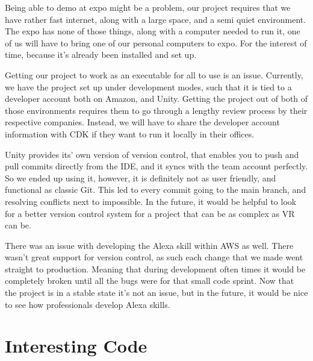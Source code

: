 \documentclass[onecolumn, draftclsnofoot,10pt, compsoc]{IEEEtran}
\begin{document}
Being able to demo at expo might be a problem, our project requires that we have rather fast internet, along with a large space, and a semi quiet environment. The expo has none of those things, along with a computer needed to run it, one of us will have to bring one of our personal computers to expo. For the interest of time, because it's already been installed and set up. \newline

Getting our project to work as an executable for all to use is an issue. Currently, we have the project set up under development modes, such that it is tied to a developer account both on Amazon, and Unity. Getting the project out of both of those environments requires them to go through a lengthy review process by their respective companies. Instead, we will have to share the developer account information with CDK if they want to run it locally in their offices. \newline

Unity provides its' own version of version control, that enables you to push and pull commits directly from the IDE, and it syncs with the team account perfectly. So we ended up using it, however, it is definitely not as user friendly, and functional as classic Git. This led to every commit going to the main branch, and resolving conflicts next to impossible. In the future, it would be helpful to look for a better version control system for a project that can be as complex as VR can be. \newline


There was an issue with developing the Alexa skill within AWS as well. There wasn't great support for version control, as such each change that we made went straight to production. Meaning that during development often times it would be completely broken until all the bugs were for that small code sprint. Now that the project is in a stable state it's not an issue, but in the future, it would be nice to see how professionals develop Alexa skills. \newline


\section{Interesting Code}
\end{document}
